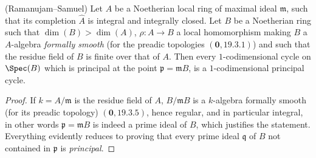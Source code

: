 \begin{theorem}[21.14.1]
\label{IV.21.14.1}
\textnormal{(Ramanujam--Samuel)}
Let $A$ be a Noetherian local ring of maximal ideal $\mathfrak{m}$, such that its completion $\hat{A}$ is integral and integrally closed.
Let $B$ be a Noetherian ring such that $\dim(B)>\dim(A)$, $\rho:A\to B$ a local homomorphism making $B$ a $A$-algebra \emph{formally smooth} (for the preadic topologies $(\mathbf{0}, 19.3.1)$) and such that the residue field of $B$ is finite over that of $A$.
Then every $1$-codimensional cycle on $\Spec(B)$ which is principal at the point $\mathfrak{p}=\mathfrak{m}B$, is a $1$-codimensional principal cycle.
\end{theorem}

\begin{proof}
If $k=A/\mathfrak{m}$ is the residue field of $A$, $B/\mathfrak{m}B$ is a $k$-algebra formally smooth (for its preadic topology) $(\mathbf{0}, 19.3.5)$, hence regular, and in particular integral, in other words $\mathfrak{p}=\mathfrak{m}B$ is indeed a prime ideal of $B$, which justifies the statement.
Everything evidently reduces to proving that every prime ideal $\mathfrak{q}$ of $B$ not contained in $\mathfrak{p}$ is \emph{principal}.


\end{proof}
